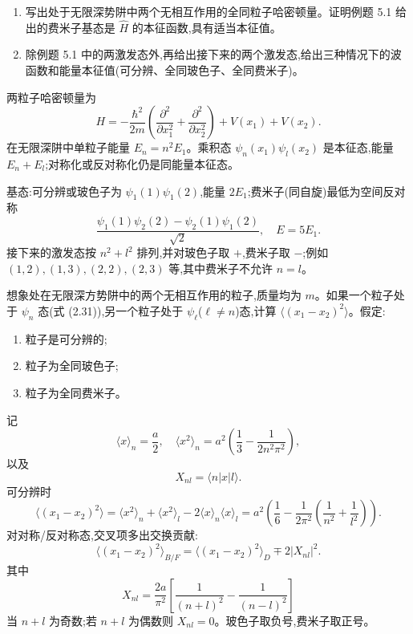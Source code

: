 \begin{question}
\begin{enumerate}
\item 写出处于无限深势阱中两个无相互作用的全同粒子哈密顿量。证明例题 5.1 给出的费米子基态是 $\hat H$ 的本征函数,具有适当本征值。
\item 除例题 5.1 中的两激发态外,再给出接下来的两个激发态,给出三种情况下的波函数和能量本征值(可分辨、全同玻色子、全同费米子)。
\end{enumerate}
\end{question}
\begin{solution}

两粒子哈密顿量为
\[
H=-\frac{\hbar^2}{2m}\left(\frac{\partial^2}{\partial x_1^2}+\frac{\partial^2}{\partial x_2^2}\right)+V(x_1)+V(x_2).
\]
在无限深阱中单粒子能量 $E_n=n^2E_1$。乘积态 $\psi_n(x_1)\psi_l(x_2)$ 是本征态,能量 $E_n+E_l$;对称化或反对称化仍是同能量本征态。

基态:可分辨或玻色子为 $\psi_1(1)\psi_1(2)$,能量 $2E_1$;费米子(同自旋)最低为空间反对称
\[
\frac{\psi_1(1)\psi_2(2)-\psi_2(1)\psi_1(2)}{\sqrt2},
\quad E=5E_1.
\]
接下来的激发态按 $n^2+l^2$ 排列,并对玻色子取 $+$,费米子取 $-$;例如 $(1,2),(1,3),(2,2),(2,3)$ 等,其中费米子不允许 $n=l$。

\end{solution}

\begin{question}
想象处在无限深方势阱中的两个无相互作用的粒子,质量均为 $m$。如果一个粒子处于 $\psi_n$ 态(式 (2.31)),另一个粒子处于 $\psi_\ell$($\ell\ne n$)态,计算 $\langle (x_1-x_2)^2\rangle$。假定:
\begin{enumerate}
\item 粒子是可分辨的;
\item 粒子为全同玻色子;
\item 粒子为全同费米子。
\end{enumerate}

\par\smallskip
{}

\end{question}
\begin{solution}

记
\[
\langle x\rangle_n=\frac a2,
\quad
\langle x^2\rangle_n=a^2\left(\frac13-\frac{1}{2n^2\pi^2}\right),
\]
以及
\[
X_{nl}=\langle n|x|l\rangle.
\]
可分辨时
\[
\langle(x_1-x_2)^2\rangle=\langle x^2\rangle_n+\langle x^2\rangle_l-2\langle x\rangle_n\langle x\rangle_l
=a^2\left(\frac16-\frac{1}{2\pi^2}\left(\frac1{n^2}+\frac1{l^2}\right)\right).
\]
对对称/反对称态,交叉项多出交换贡献:
\[
\langle(x_1-x_2)^2\rangle_{B/F}=\langle(x_1-x_2)^2\rangle_{D}
\mp 2|X_{nl}|^2.
\]
其中
\[
X_{nl}=\frac{2a}{\pi^2}\left[\frac{1}{(n+l)^2}-\frac{1}{(n-l)^2}\right]
\]
当 $n+l$ 为奇数;若 $n+l$ 为偶数则 $X_{nl}=0$。玻色子取负号,费米子取正号。

\end{solution}

